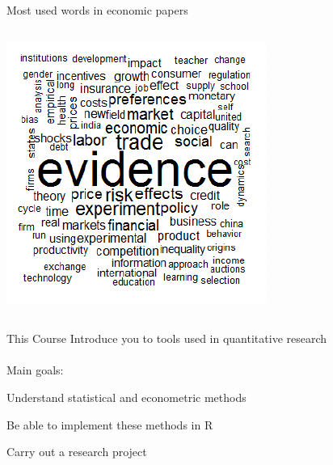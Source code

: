 \documentclass{./../div_teaching_slides}
\begin{document}
\begin{frame}{Most used words in economic papers}
\begin{columns}
\begin{column}[c]{0.3\textwidth}
\includegraphics[scale=0.4]{2010.png}
\end{column}
\end{columns}
\end{frame}


\begin{frame}{This Course}
Introduce you to tools used in quantitative research \\~\\
Main goals:\\
\begin{witemize}
\item Understand statistical and econometric methods
\item Be able to implement these methods in R
\item Carry out a research project
\end{witemize}
\end{frame}

\end{document}
